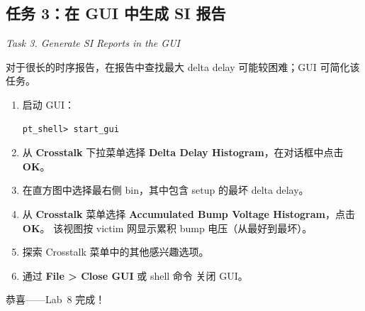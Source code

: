 \subsection{任务 3：在 GUI 中生成 SI 报告}
\label{lab8:task3}

\noindent\textit{Task 3. Generate SI Reports in the GUI}

对于很长的时序报告，在报告中查找最大 delta delay 可能较困难；GUI 可简化该任务。

\begin{enumerate}
  \item 启动 GUI：
\begin{lstlisting}
pt_shell> start_gui
\end{lstlisting}

  \item 从 \textbf{Crosstalk} 下拉菜单选择 \textbf{Delta Delay Histogram}，在对话框中点击 \textbf{OK}。

  \item 在直方图中选择最右侧 bin，其中包含 setup 的最坏 delta delay。

  \item 从 \textbf{Crosstalk} 菜单选择 \textbf{Accumulated Bump Voltage Histogram}，点击 \textbf{OK}。
        该视图按 victim 网显示累积 bump 电压（从最好到最坏）。

  \item 探索 Crosstalk 菜单中的其他感兴趣选项。

  \item 通过 \textbf{File > Close GUI} 或 shell 命令  关闭 GUI。
\end{enumerate}

\noindent 恭喜——Lab~8 完成！
